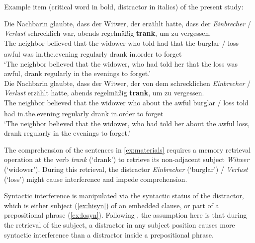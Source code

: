 \documentclass[a4paper, man, floatsintext]{apa7}
\begin{document}
\begin{exe}  
\ex \label{ex:materials} Example item (critical word in bold, distractor in italics) of the present study:
    \begin{xlist}   
    \label{ex:hisyn} 
    \gll Die  Nachbarin glaubte,	dass	der Witwer,  der  erzählt hatte, dass der \textit{Einbrecher} / \textit{Verlust}  schrecklich war, abends regelmäßig \textbf{trank}, um zu vergessen.\\ 
    The\textsubscript{} neighbor\textsubscript{} believed that the widower who told had that the burglar / loss awful was in.the.evening regularly drank in.order to forget \\
    \trans `The neighbor believed that the widower, who had told her that the loss was awful, drank regularly in the evenings to forget.' \\
    
    \label{ex:losyn} 
    \gll Die  Nachbarin glaubte, dass der Witwer,  der  von    dem schrecklichen \textit{Einbrecher} / \textit{Verlust} erzählt hatte, abends regelmäßig \textbf{trank}, um zu vergessen. \\ 
    The\textsubscript{} neighbor\textsubscript{} believed that the widower who about the awful burglar / loss told had in.the.evening regularly drank in.order to forget\\
    \trans `The neighbor believed that the widower, who had told her about the awful loss, drank regularly in the evenings to forget.'  \\
    \end{xlist}
\end{exe}

The comprehension of the sentences in \ref{ex:materials} requires a memory retrieval operation at the verb \textit{trank} (`drank') to retrieve its non-adjacent subject \textit{Witwer} (`widower'). During this retrieval, the distractor \textit{Einbrecher} (`burglar') / \textit{Verlust} (`loss') might cause interference and impede comprehension. 

Syntactic interference is manipulated via the syntactic status of the distractor, which is either subject (\ref{ex:hisyn}) of an embedded clause, or part of a prepositional phrase (\ref{ex:losyn}). Following \textcite{vandyke07}, the assumption here is that  during the retrieval of the subject, a distractor in any subject position causes more syntactic interference than a distractor inside a prepositional phrase. 
\end{document}
